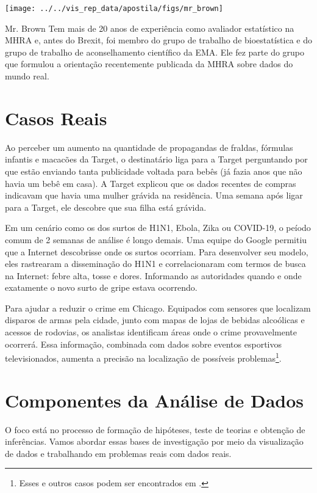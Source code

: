 \documentclass[article]{memoir}
\begin{document}
\begin{marginfigure}
	\centering
	\texttt{[image: ../../vis\_rep\_data/apostila/figs/mr\_brown]}
	\caption{Mr. Brown  Tem mais de 20 anos de experiência como avaliador estatístico na MHRA e, antes do Brexit, foi membro do grupo de trabalho de bioestatística e do grupo de trabalho de aconselhamento científico da EMA. Ele fez parte do grupo que formulou a orientação recentemente publicada da MHRA sobre dados do mundo real.}
	\label{fig:mrbrown}
\end{marginfigure}

\section{Casos Reais}
Ao perceber um aumento na quantidade de propagandas de fraldas, fórmulas infantis e macacões da Target, o destinatário liga para a Target perguntando por que estão enviando tanta publicidade voltada para bebês (já fazia anos que não havia um bebê em casa). A Target explicou que os dados recentes de compras indicavam que havia uma mulher grávida na residência. Uma semana após ligar para a Target, ele descobre que sua filha está grávida.

Em um cenário como os dos surtos de H1N1, Ebola, Zika ou COVID-19, o peíodo comum de 2 semanas de análise é longo demais. Uma equipe do Google permitiu que a Internet descobrisse onde os surtos ocorriam. Para desenvolver seu modelo, eles rastrearam a disseminação do H1N1 e correlacionaram com termos de busca na Internet: febre alta, tosse e dores. Informando as autoridades quando e onde exatamente o novo surto de gripe estava ocorrendo.

Para ajudar a reduzir o crime em Chicago. Equipados com sensores que localizam disparos de armas pela cidade, junto com mapas de lojas de bebidas alcoólicas e acessos de rodovias, os analistas identificam áreas onde o crime provavelmente ocorrerá. Essa informação, combinada com dados sobre eventos esportivos televisionados, aumenta a precisão na localização de possíveis problemas\footnote{Esses e outros casos podem ser encontrados em \cite{mayer2013big}.}. 




\section{Componentes da Análise de Dados}
O foco está no processo de formação de hipóteses, teste de teorias e obtenção de inferências. Vamos abordar  essas bases de investigação por meio da visualização de dados e trabalhando em problemas reais com dados reais.
\end{document}
